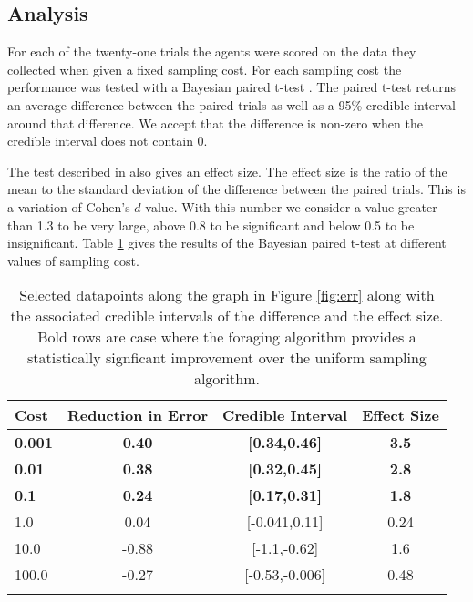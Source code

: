 \subsection{Analysis}

For each of the twenty-one trials the agents were scored on the data they collected when given a fixed sampling cost.  For each sampling cost the performance was tested with a Bayesian paired t-test \cite{baath2014bayesian}.  The paired t-test returns an average difference between the paired trials as well as a 95\% credible interval around that difference.  We accept that the difference is non-zero when the credible interval does not contain 0.  

The test described in \cite{baath2014bayesian} also gives an effect size.  The effect size is the ratio of the mean to the standard deviation of the difference between the paired trials.  This is a variation of Cohen's $d$ value\cite{cohen2013statistical}.  With this number we consider a value greater than 1.3 to be very large, above 0.8 to be significant and below 0.5 to be insignificant.  Table \ref{tbl:ttest} gives the results of the Bayesian paired t-test at different values of sampling cost.

\begin{table}[htpd!]
	\centering
	\begin{tabular}{lccc}
		Cost & Reduction in Error & Credible Interval & Effect Size \\
		\hline
		\textbf{0.001} & \textbf{0.40} & \textbf{[0.34,0.46]} & \textbf{3.5}\\
		\textbf{0.01} & \textbf{0.38} & \textbf{[0.32,0.45]} & \textbf{2.8}\\
		\textbf{0.1} & \textbf{0.24} & \textbf{[0.17,0.31]} & \textbf{1.8}\\
		1.0 & 0.04 & [-0.041,0.11] & 0.24\\
		10.0 & -0.88 & [-1.1,-0.62] & 1.6\\
		100.0 & -0.27 & [-0.53,-0.006] & 0.48\\
		\hline \\
	\end{tabular}
	\caption{Selected datapoints along the graph in Figure \ref{fig:err} along with the associated credible intervals of the difference and the effect size.  Bold rows are case where the foraging algorithm provides a statistically signficant improvement over the uniform sampling algorithm.}
	\label{tbl:ttest}
\end{table}
